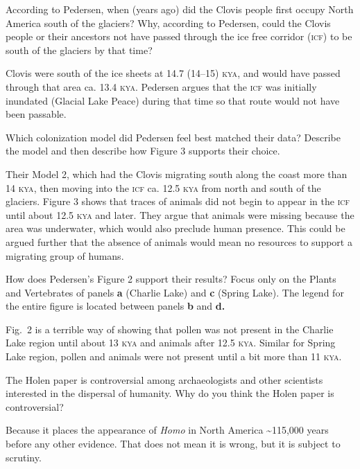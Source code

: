 \documentclass[11pt, hidelinks, addpoints]{exam}
\newcommand{\icf}{\textsc{icf}}
\newcommand{\kya}{\textsc{kya}}
\begin{document}
\begin{questions}
\question[5]
According to Pedersen, when (years ago) did the Clovis people first occupy North America south of the glaciers? Why, according to Pedersen, could the Clovis people or their ancestors not have passed through the ice free corridor (\icf{}) to be south of the glaciers by that time?

\begin{solution}
	Clovis were south of the ice sheets at 14.7 (14–15) \textsc{kya}, and would have passed through that area ca. 13.4 \kya. Pedersen argues that the \icf{} was initially inundated (Glacial Lake Peace) during that time so that route would not have been passable.
\end{solution}

\question[5]
Which colonization model did Pedersen feel best matched their data? Describe the model and then describe how Figure 3 supports their choice. 

\begin{solution}
Their Model 2, which had the Clovis migrating south along the coast more than 14 \kya, then moving into the \icf{} ca. 12.5 \kya{} from north and south of the glaciers. Figure 3 shows that traces of animals did not begin to appear in the \icf{} until about 12.5 \kya{} and later. They argue that animals were missing because the area was underwater, which would also preclude human presence. This could be argued further that the absence of animals would mean no resources to support a migrating group of humans.
\end{solution}

\question[5]
How does Pedersen's Figure 2 support their results? Focus only on the Plants and Vertebrates of panels \textbf{a} (Charlie Lake) and \textbf{c} (Spring Lake). The legend for the entire figure is located between panels \textbf{b} and \textbf{d.}

\begin{solution}
Fig.~2 is a terrible way of showing that pollen was not present in the Charlie Lake region until about 13 \kya{} and animals after 12.5 \kya. Similar for Spring Lake region, pollen and animals were not present until a bit more than 11 \kya.
\end{solution}


\question[5]
The Holen paper is controversial among archaeologists and other scientists interested in the dispersal of humanity. Why do you think the Holen paper is controversial? 

\begin{solution}
Because it places the appearance of \textit{Homo} in North America \textasciitilde115,000 years before any other evidence. That does not mean it is wrong, but it is subject to scrutiny.
\end{solution}



\end{questions}
\end{document}
